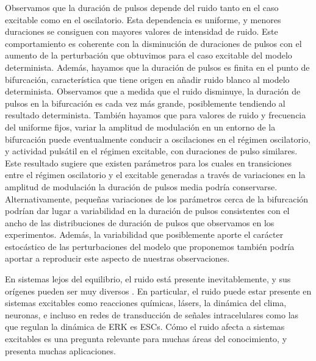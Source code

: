 \documentclass[./main.tex]{subfiles}
\begin{document}
Observamos que la duración de pulsos depende del ruido tanto en el caso excitable como en el oscilatorio. Esta dependencia es uniforme, y menores duraciones se consiguen con mayores valores de intensidad de ruido. Este comportamiento es coherente con la disminución de duraciones de pulsos con el aumento de la perturbación que obtuvimos para el caso excitable del modelo determinista. Además, hayamos que la duración de pulsos es finita en el punto de bifurcación, característica que tiene origen en añadir ruido blanco al modelo determinista. Observamos que a medida que el ruido disminuye, la duración de pulsos en la bifurcación es cada vez más grande, posiblemente tendiendo al resultado determinista. También hayamos que para valores de ruido y frecuencia del uniforme fijos, variar la amplitud de modulación en un entorno de la bifurcación puede eventualmente conducir a oscilaciones en el régimen oscilatorio, y actividad pulsátil en el régimen excitable, con duraciones de pulso similares. Este resultado sugiere que existen parámetros para los cuales en transiciones entre el régimen oscilatorio y el excitable generadas a través de variaciones en la amplitud de modulación la duración de pulsos media podría conservarse. Alternativamente, pequeñas variaciones de los parámetros cerca de la bifurcación podrían dar lugar a variabilidad en la duración de pulsos consistentes con el ancho de las distribuciones de duración de pulsos que observamos en los experimentos. Además, la variabilidad que posiblemente aporte el carácter estocástico de las perturbaciones del modelo que proponemos también podría aportar a reproducir este aspecto de nuestras observaciones. 

En sistemas lejos del equilibrio, el ruido está presente inevitablemente, y sus orígenes pueden ser muy diversos \cite{Lindner2004}. En particular, el ruido puede estar presente en sistemas excitables como reacciones químicas, lásers, la dinámica del clima, neuronas, e incluso en redes de transducción de señales intracelulares como las que regulan la dinámica de ERK es ESCs. Cómo el ruido afecta a sistemas excitables es una pregunta relevante para muchas áreas del conocimiento, y presenta muchas aplicaciones.
\end{document}
